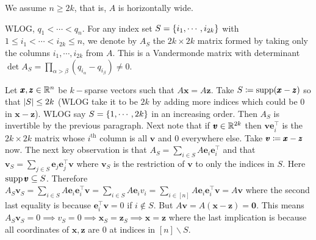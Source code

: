 \soln

We assume $n \ge 2k$, that is, $A$ is horizontally wide.

WLOG, $q_{1}< \cdots < q_{n}$. For any index set $S=\left\{i_{1},\cdots,i_{2k}\right\}$ with $1\le i_{1}<\cdots<i_{2k}\le n$, we denote by $A_{S}$ the $2k\times 2k$ matrix formed by taking only the columns $i_{1},\cdots,i_{2k}$ from $A$. This is a Vandermonde matrix with determinant $\det A_{S} = \prod_{\alpha>\beta}(q_{i_{\alpha}}-q_{i_{\beta}}) \ne 0$. %

Let $\pmb x,\pmb z\in\mathbb{R}^{n}$ be $k-$sparse vectors such that $A\pmb x = A\pmb z$. Take $S\coloneqq \operatorname{supp} (\pmb x-\pmb z)$ so that $\left| S \right| \le 2k$ (WLOG take it to be $2k$ by adding more indices which could be $0$ in $\pmb x-\pmb z$). WLOG say $S=\left\{{1},\cdots,{2k}\right\}$ in an increasing order. Then $A_{S}$ is invertible by the previous paragraph. Next note that if $\pmb v\in\mathbb{R}^{2k}$ then $\pmb v \pmb e_{i}^{\top}$ is the $2k\times 2k$ matrix whose $i^{\text{th}}$ column is all $\pmb v$ and $0$ everywhere else. Take $\pmb v\coloneqq \pmb x-\pmb z$ now. The next key observation is that $A_{S} = \sum_{i\in S} A\pmb e_{i} \pmb e_{i}^{\top}$ and that $\pmb v_{S} =  \sum_{j\in S}\pmb e_{j}\pmb e_{j}^{\top}\pmb v$ where $\pmb v_{S}$ is the restriction of $\pmb v$ to only the indices in $S$. Here $\operatorname{supp} \pmb v\subseteq S$. Therefore $A_{S}\pmb v_{S} = \sum_{i\in S}A \pmb e_{i} \pmb e_{i}^{\top}\pmb v = \sum_{i\in S}A \pmb e_{i} v_{i} = \sum_{i\in [n]}A \pmb e_{i} \pmb e_{i}^{\top}\pmb v = A\pmb v$ where the second last equality is because $\pmb e_{i}^{\top}\pmb v=0$ if $i\notin S$. But $A\pmb v = A(\pmb x-\pmb z) = \pmb0$. This means $A_{S}\pmb v_{S} = 0\implies v_{S} = 0 \implies \pmb x_{S} = \pmb z_{S} \implies \pmb x = \pmb z$ where the last implication is because all coordinates of $\pmb x,\pmb z$ are $0$ at indices in $[n]\smallsetminus S$.





\newpage
\pb

